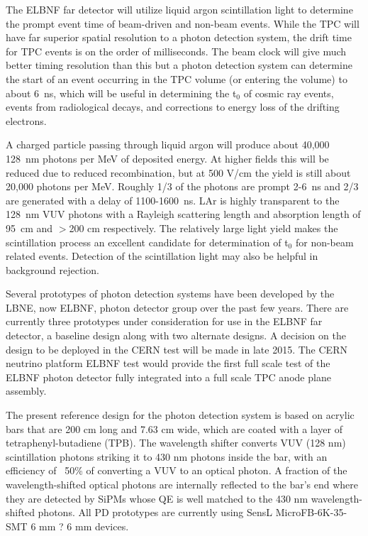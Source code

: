 



The ELBNF far detector will utilize liquid argon scintillation light to determine the prompt event time of beam-driven and non-beam events. While the TPC will have far superior spatial resolution to a photon detection system, the drift time for TPC events is on the order of milliseconds. The beam clock will give much better timing resolution than this but a photon detection system can determine the start of an event occurring in the TPC volume (or entering the volume) to about 6~ns, which will be useful in determining the t$_0$ of cosmic ray events, events from radiological decays, and corrections to energy loss of the drifting electrons. 

A charged particle passing through liquid argon will produce about 40,000 128~nm photons per MeV of deposited energy. At higher fields this will be reduced due to reduced recombination, but at 500 V/cm the yield is still about 20,000 photons per MeV. Roughly 1/3 of the photons are prompt 2-6~ns and 2/3 are generated with a delay of 1100-1600~ns. LAr is highly transparent to the 128~nm VUV photons with a Rayleigh scattering length and absorption length of 95~cm and $>$200 cm respectively. The relatively large light yield makes the scintillation process an excellent candidate for determination of t$_0$ for non-beam related events. Detection of the scintillation light may also be helpful in background rejection.

Several prototypes of photon detection systems have been developed by the LBNE, now ELBNF, photon detector group over the past few years. There are currently three prototypes under consideration for use in the ELBNF far detector, a baseline design along with two alternate designs. A decision on the design to be deployed in the CERN test will be made in late 2015. The CERN neutrino platform ELBNF test would provide the first full scale test of the ELBNF photon detector fully integrated into a full scale TPC anode plane assembly. 

The present reference design for the photon detection system is based on acrylic bars that are 200 cm long and 7.63 cm wide, which are coated with a layer of tetraphenyl-butadiene (TPB). The wavelength shifter converts VUV (128 nm) scintillation photons striking it to 430 nm photons inside the bar, with an efficiency of ~50\% of converting a VUV to an optical photon.  A fraction of the wavelength-shifted optical photons are internally reflected to the bar's end where they are detected by SiPMs whose QE is well matched to the 430 nm wavelength-shifted photons. All PD prototypes are currently using SensL MicroFB-6K-35-SMT 6 mm ? 6 mm devices. 

